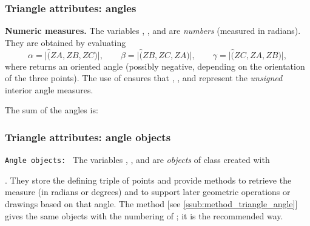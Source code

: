 \subsubsection{Triangle attributes: angles} %
\label{ssub:triangle_attributes_angles}
\noindent\textbf{Numeric measures.}
The variables , , and  are \emph{numbers}
(measured in radians). They are obtained by evaluating
\[
\alpha = \lvert \widehat(ZA,ZB,ZC)\rvert,\qquad
\beta  = \lvert \widehat(ZB,ZC,ZA)\rvert,\qquad
\gamma = \lvert \widehat(ZC,ZA,ZB)\rvert,
\]
where  returns an oriented angle (possibly negative,
depending on the orientation of the three points). The use of
 ensures that , , and 
represent the \emph{unsigned} interior angle measures.

\begin{tkzexample}[latex=.5\textwidth-2cm]
\def\wangle#1{\tkzPN[2]{%
    \tkzUseLua{math.deg(T.ABC.#1)}}}
\begin{center}
\end{center}
The sum of the angles is: 
\end{tkzexample}


\subsubsection{Triangle attributes: angle objects} %
\label{ssub:triangle_attributes_angles_objects}
\noindent\texttt{Angle objects: }
The variables , , and  are
\emph{objects} of class  created with

.
They store the defining triple of points and provide methods to
retrieve the measure (in radians or degrees) and to support later
geometric operations or drawings based on that angle.
The method  [see \ref{ssub:method_triangle_angle}]
gives the same objects with the numbering of ;
it is the recommended way.

